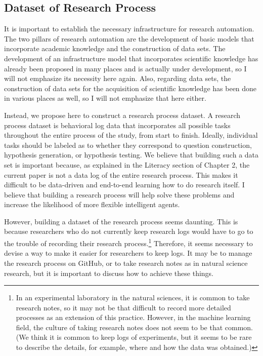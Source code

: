 \subsection{Dataset of Research Process}
It is important to establish the necessary infrastructure for research automation. The two pillars of research automation are the development of basic models that incorporate academic knowledge and the construction of data sets. The development of an infrastructure model that incorporates scientific knowledge has already been proposed in many places and is actually under development, so I will not emphasize its necessity here again. Also, regarding data sets, the construction of data sets for the acquisition of scientific knowledge has been done in various places as well, so I will not emphasize that here either.

Instead, we propose here to construct a research process dataset. A research process dataset is behavioral log data that incorporates all possible tasks throughout the entire process of the study, from start to finish. Ideally, individual tasks should be labeled as to whether they correspond to question construction, hypothesis generation, or hypothesis testing. We believe that building such a data set is important because, as explained in the Literacy section of Chapter 2, the current paper is not a data log of the entire research process. This makes it difficult to be data-driven and end-to-end learning how to do research itself. I believe that building a research process will help solve these problems and increase the likelihood of more flexible intelligent agents.

However, building a dataset of the research process seems daunting. This is because researchers who do not currently keep research logs would have to go to the trouble of recording their research process.\footnote{
In an experimental laboratory in the natural sciences, it is common to take research notes, so it may not be that difficult to record more detailed processes as an extension of this practice. However, in the machine learning field, the culture of taking research notes does not seem to be that common. (We think it is common to keep logs of experiments, but it seems to be rare to describe the details, for example, where and how the data was obtained.) 
} Therefore, it seems necessary to devise a way to make it easier for researchers to keep logs. It may be to manage the research process on GitHub, or to take research notes as in natural science research, but it is important to discuss how to achieve these things.

